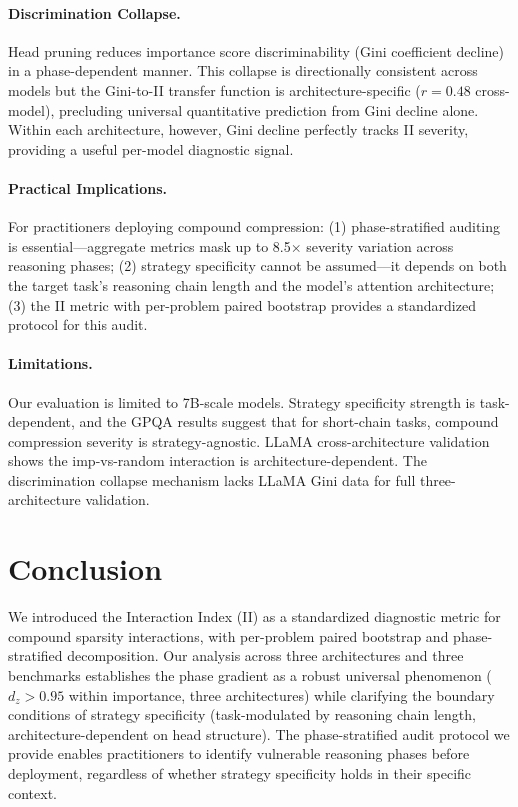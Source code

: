 \documentclass[11pt,a4paper]{article}
\begin{document}
\paragraph{Discrimination Collapse.}
Head pruning reduces importance score discriminability (Gini coefficient decline) in a phase-dependent manner. This collapse is directionally consistent across models but the Gini-to-II transfer function is architecture-specific ($r = 0.48$ cross-model), precluding universal quantitative prediction from Gini decline alone. Within each architecture, however, Gini decline perfectly tracks II severity, providing a useful per-model diagnostic signal.

\paragraph{Practical Implications.}
For practitioners deploying compound compression: (1) phase-stratified auditing is essential---aggregate metrics mask up to 8.5$\times$ severity variation across reasoning phases; (2) strategy specificity cannot be assumed---it depends on both the target task's reasoning chain length and the model's attention architecture; (3) the II metric with per-problem paired bootstrap provides a standardized protocol for this audit.

\paragraph{Limitations.}
Our evaluation is limited to 7B-scale models. Strategy specificity strength is task-dependent, and the GPQA results suggest that for short-chain tasks, compound compression severity is strategy-agnostic. LLaMA cross-architecture validation shows the imp-vs-random interaction is architecture-dependent. The discrimination collapse mechanism lacks LLaMA Gini data for full three-architecture validation.

\section{Conclusion}

We introduced the Interaction Index (II) as a standardized diagnostic metric for compound sparsity interactions, with per-problem paired bootstrap and phase-stratified decomposition. Our analysis across three architectures and three benchmarks establishes the phase gradient as a robust universal phenomenon ($d_z > 0.95$ within importance, three architectures) while clarifying the boundary conditions of strategy specificity (task-modulated by reasoning chain length, architecture-dependent on head structure). The phase-stratified audit protocol we provide enables practitioners to identify vulnerable reasoning phases before deployment, regardless of whether strategy specificity holds in their specific context.
\end{document}
